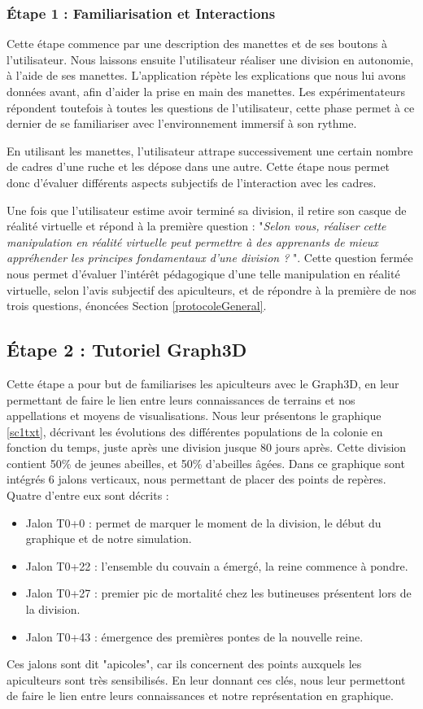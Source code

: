 		\subsubsection{Étape 1 : Familiarisation et Interactions}
		Cette étape commence par une description des manettes et de ses boutons à l'utilisateur. Nous laissons ensuite l'utilisateur réaliser une division en autonomie, à l'aide de ses manettes. L'application répète les explications que nous lui avons données avant, afin d'aider la prise en main des manettes. Les expérimentateurs répondent toutefois à toutes les questions de l'utilisateur, cette phase permet à ce dernier de se familiariser avec l'environnement immersif à son rythme.
		
		En utilisant les manettes, l'utilisateur attrape successivement une certain nombre de cadres d'une ruche et les dépose dans une autre. Cette étape nous permet donc d'évaluer différents aspects subjectifs de l'interaction avec les cadres.
		
		Une fois que l'utilisateur estime avoir terminé sa division, il retire son casque de réalité virtuelle et répond à la première question : "\textit{Selon vous, réaliser cette manipulation en réalité virtuelle peut permettre à des apprenants de mieux appréhender les principes fondamentaux d'une division ? }". Cette question fermée nous permet d'évaluer l'intérêt pédagogique d'une telle manipulation en réalité virtuelle, selon l'avis subjectif des apiculteurs, et de répondre à la première de nos trois questions, énoncées Section \ref{protocoleGeneral}.
		
		\subsection{Étape 2 : Tutoriel Graph3D}
		Cette étape a pour but de familiarises les apiculteurs avec le Graph3D, en leur permettant de faire le lien entre leurs connaissances de terrains et nos appellations et moyens de visualisations. Nous leur présentons le graphique \ref{sc1txt}, décrivant les évolutions des différentes populations de la colonie en fonction du temps, juste après une division jusque 80 jours après. Cette division contient 50\% de jeunes abeilles, et 50\% d'abeilles âgées. Dans ce graphique sont intégrés 6 jalons verticaux, nous permettant de placer des points de repères. Quatre d'entre eux sont décrits :
		\begin{itemize}
			\item Jalon T0+0 : permet de marquer le moment de la division, le début du graphique et de notre simulation.
			\item Jalon T0+22 : l'ensemble du couvain a émergé, la reine commence à pondre.
			\item Jalon T0+27 : premier pic de mortalité chez les butineuses présentent lors de la division.
			\item Jalon T0+43 : émergence des premières pontes de la nouvelle reine.
		\end{itemize}
		Ces jalons sont dit "apicoles", car ils concernent des points auxquels les apiculteurs sont très sensibilisés. En leur donnant ces clés, nous leur permettont de faire le lien entre leurs connaissances et notre représentation en graphique.
		
